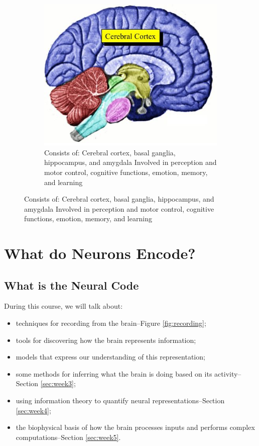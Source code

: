 \documentclass[]{article}
\begin{document}
\begin{figure}[H]
\begin{subfigure}[b]{0.45\textwidth}
	\end{subfigure}
	\begin{subfigure}[b]{0.45\textwidth}
		\caption{ Consists of: Cerebral cortex, basal ganglia, 	hippocampus, and amygdala
		Involved in perception 	and motor control, 	cognitive functions,	emotion, memory, and learning}
		\includegraphics[width=\textwidth]{Cerebrum}
	\end{subfigure}
\end{figure}
\section{What do Neurons Encode?}\label{sec:week2}
\subsection{What is the Neural Code}
During this course, we will talk about:
\begin{itemize}
	\item techniques for recording from the brain--Figure \ref{fig:recording};
	\item  tools for discovering how the brain represents information;
	\item models that express our understanding of this representation;
	\item  some methods for inferring what the brain is doing based on its activity--Section \ref{sec:week3};
	\item  using information theory to quantify neural representations--Section \ref{sec:week4};
	\item the biophysical basis of how the brain processes inputs and performs complex computations--Section \ref{sec:week5}.
\end{itemize}
\end{document}
